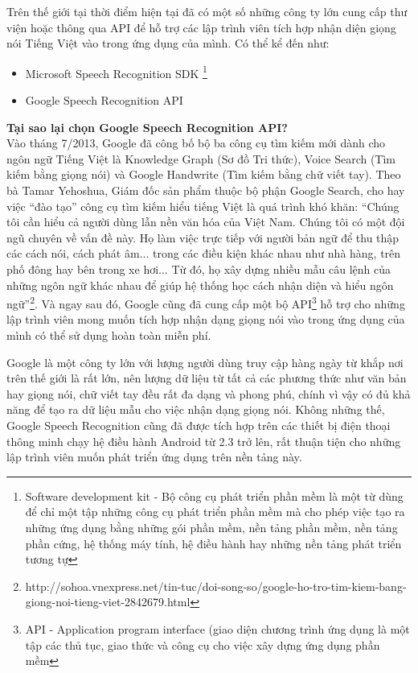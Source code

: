 \documentclass[12pt]{report}
\begin{document}
Trên thế giới tại thời điểm hiện tại đã có một số những công ty lớn cung cấp thư viện hoặc thông qua API để hỗ trợ các lập trình viên tích hợp nhận diện giọng nói Tiếng Việt vào trong ứng dụng của mình. Có thể kể đến như:

\begin{itemize}
	\item Microsoft Speech Recognition SDK \footnote{Software development kit - Bộ công cụ phát triển phần mềm là một từ dùng để chỉ một tập những công cụ phát triển phần mềm mà cho phép việc tạo ra những ứng dụng bằng những gói phần mềm, nền tảng phần mềm, nền tảng phần cứng, hệ thống máy tính, hệ điều hành hay những nền tảng phát triển tương tự}
	\item Google Speech Recognition API
\end{itemize}
\noindent \textbf{Tại sao lại chọn Google Speech Recognition API?}\\[0.3cm]
\noindent Vào tháng 7/2013, Google đã công bố bộ ba công cụ tìm kiếm mới dành cho ngôn ngữ Tiếng Việt là Knowledge Graph (Sơ đồ Tri thức), Voice Search (Tìm kiếm bằng giọng nói) và Google Handwrite (Tìm kiếm bằng chữ viết tay). Theo bà Tamar Yehoshua, Giám đốc sản phẩm thuộc bộ phận Google Search, cho hay việc ``đào tạo'' công cụ tìm kiếm hiểu tiếng Việt là quá trình khó khăn: ``Chúng tôi cần hiểu cả người dùng lẫn nền văn hóa của Việt Nam. Chúng tôi có một đội ngũ chuyên về vấn đề này. Họ làm việc trực tiếp với người bản ngữ để thu thập các cách nói, cách phát âm... trong các điều kiện khác nhau như nhà hàng, trên phố đông hay bên trong xe hơi... Từ đó, họ xây dựng nhiều mẫu câu lệnh của những ngôn ngữ khác nhau để giúp hệ thống học cách nhận diện và hiểu ngôn ngữ''{\footnote{http://sohoa.vnexpress.net/tin-tuc/doi-song-so/google-ho-tro-tim-kiem-bang-giong-noi-tieng-viet-2842679.html}}. Và ngay sau đó, Google cũng đã cung cấp một bộ API{\footnote{API - Application program interface (giao diện chương trình ứng dụng là một tập các thủ tục, giao thức và công cụ cho việc xây dựng ứng dụng phần mềm}} hỗ trợ cho những lập trình viên mong muốn tích hợp nhận dạng giọng nói vào trong ứng dụng của mình có thể sử dụng hoàn toàn miễn phí.

Google là một công ty lớn với lượng người dùng truy cập hàng ngày từ khắp nơi trên thế giới là rất lớn, nên lượng dữ liệu từ tất cả các phương thức như văn bản hay giọng nói, chữ viết tay đều rất đa dạng và phong phú, chính vì vậy có đủ khả năng để tạo ra dữ liệu mẫu cho việc nhận dạng giọng nói. Không những thế, Google Speech Recognition cũng đã được tích hợp trên các thiết bị điện thoại thông minh chạy hệ điều hành Android từ 2.3 trở lên, rất thuận tiện cho những lập trình viên muốn phát triển ứng dụng trên nền tảng này.
\end{document}
